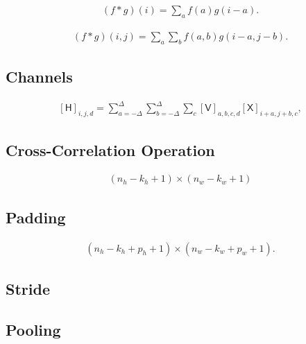 \documentclass[a4paper,12pt]{article}
\theoremstyle{definition}
\begin{document}
\begin{equation*}
    \begin{aligned}
        (f * g)(i) = \sum_a f(a) g(i-a).
    \end{aligned}
\end{equation*}

\begin{equation*}
    \begin{aligned}
        (f * g)(i, j) = \sum_a\sum_b f(a, b) g(i-a, j-b).
    \end{aligned}
\end{equation*}

\subsection*{Channels}
\begin{equation*}
    \begin{aligned}
        [\mathsf{H}]_{i,j,d} = \sum_{a = -\Delta}^{\Delta} \sum_{b = -\Delta}^{\Delta} \sum_c [\mathsf{V}]_{a, b, c, d} [\mathsf{X}]_{i+a, j+b, c},
    \end{aligned}
\end{equation*}

\subsection*{Cross-Correlation Operation}
\begin{equation*}
    \begin{aligned}
        (n_h-k_h+1) \times (n_w-k_w+1)
    \end{aligned}
\end{equation*}

\subsection*{Padding}
\begin{equation*}
    \begin{aligned}
        (n_h-k_h+p_h+1)\times(n_w-k_w+p_w+1).
    \end{aligned}
\end{equation*}

\subsection*{Stride}

\subsection*{Pooling}
\end{document}
